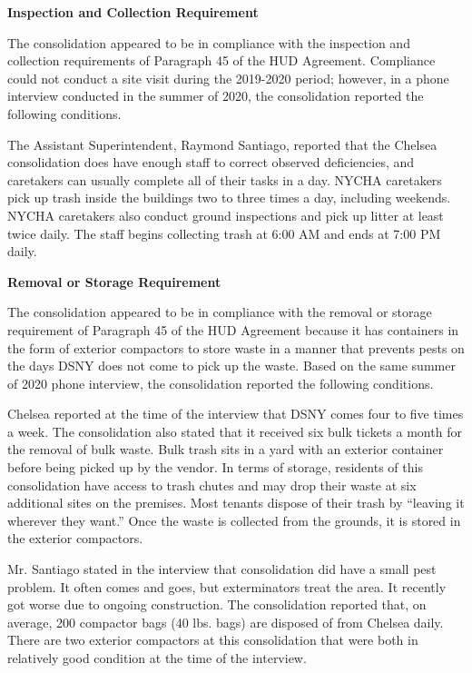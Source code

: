 

\textbf{Inspection and Collection Requirement} 

 

The consolidation appeared to be in compliance with the inspection and collection requirements of Paragraph 45 of the HUD Agreement. Compliance could not conduct a site visit during the 2019-2020 period; however, in a phone interview conducted in the summer of 2020, the consolidation reported the following conditions.

The Assistant Superintendent, Raymond Santiago, reported that the Chelsea consolidation does have enough staff to correct observed deficiencies, and caretakers can usually complete all of their tasks in a day. NYCHA caretakers pick up trash inside the buildings two to three times a day, including weekends. NYCHA caretakers also conduct ground inspections and pick up litter at least twice daily. The staff begins collecting trash at 6:00 AM and ends at 7:00 PM daily.

\textbf{Removal or Storage Requirement} 

The consolidation appeared to be in compliance with the removal or storage requirement of Paragraph  45 of the HUD Agreement because it has containers in the form of exterior compactors to store waste in a manner that prevents pests on the days DSNY does not come to pick up the waste. Based on the same summer of  2020  phone interview, the consolidation reported the following conditions.

 

Chelsea reported at the time of the interview that DSNY comes four to five times a week. The consolidation also stated that it received six bulk tickets a month for the removal of bulk waste. Bulk trash sits in a yard with an exterior container before being picked up by the vendor. In terms of storage, residents of this consolidation have access to trash chutes and may drop their waste at six additional sites on the premises. Most tenants dispose of their trash by ``leaving it wherever they want.'' Once the waste is collected from the grounds, it is stored in the exterior compactors.  

 

Mr. Santiago stated in the interview that consolidation did have a small pest problem. It often comes and goes, but exterminators treat the area. It recently got worse due to ongoing construction. The consolidation reported that, on average, 200 compactor bags (40 lbs. bags)  are disposed of from Chelsea daily. There are two exterior compactors at this consolidation that were both in relatively good condition at the time of the interview.

